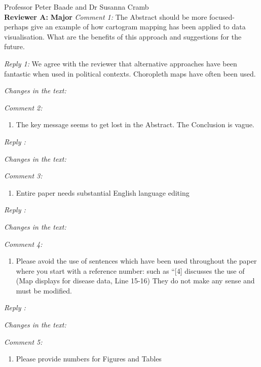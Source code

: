 \documentclass[11pt,a4paper,]{letter}
\providecommand{\tightlist}{%
  \setlength{\itemsep}{0pt}\setlength{\parskip}{0pt}}
\begin{document}
\begin{letter}{Professor Peter Baade and Dr Susanna Cramb\\}
\textbf{Reviewer A: }
\textbf{Major}
\emph{Comment 1: }
The Abstract should be more focused- perhaps give an example of how cartogram mapping has been applied to data visualisation. What are the benefits of this approach and suggestions for the future.

\emph{Reply 1:}
We agree with the reviewer that alternative approaches have been fantastic when used in political contexts. Choropleth maps have often been used.

\emph{Changes in the text:}

\emph{Comment 2: }

\begin{enumerate}
\def\labelenumi{\arabic{enumi}.}
\setcounter{enumi}{1}
\tightlist
\item
  The key message seems to get lost in the Abstract. The Conclusion is vague.
\end{enumerate}

\emph{Reply :}

\emph{Changes in the text:}

\emph{Comment 3: }

\begin{enumerate}
\def\labelenumi{\arabic{enumi}.}
\setcounter{enumi}{2}
\tightlist
\item
  Entire paper needs substantial English language editing
\end{enumerate}

\emph{Reply :}

\emph{Changes in the text:}

\emph{Comment 4: }

\begin{enumerate}
\def\labelenumi{\arabic{enumi}.}
\setcounter{enumi}{3}
\tightlist
\item
  Please avoid the use of sentences which have been used throughout the paper where you start with a reference number: such as ``{[}4{]} discusses the use of (Map displays for disease data, Line 15-16) They do not make any sense and must be modified.
\end{enumerate}

\emph{Reply :}

\emph{Changes in the text:}

\emph{Comment 5: }

\begin{enumerate}
\def\labelenumi{\arabic{enumi}.}
\setcounter{enumi}{4}
\tightlist
\item
  Please provide numbers for Figures and Tables
\end{enumerate}


\end{letter}
\end{document}
